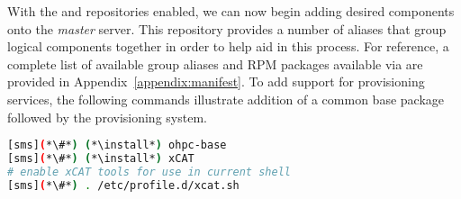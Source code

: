 
With the \OHPC{} and \xCAT{} repositories enabled, we can now begin adding desired components onto the {\em master}
server. This repository provides a number of aliases that group logical components together in order to help aid in this
process. For reference, a complete list of available group aliases and RPM packages available via \OHPC{} are provided
in Appendix~\ref{appendix:manifest}. To add support for provisioning services, the following commands illustrate
addition of a common base package followed by the \xCAT{} provisioning system.

\begin{lstlisting}[language=bash,keywords={}]
[sms](*\#*) (*\install*) ohpc-base
[sms](*\#*) (*\install*) xCAT
# enable xCAT tools for use in current shell
[sms](*\#*) . /etc/profile.d/xcat.sh
\end{lstlisting}


